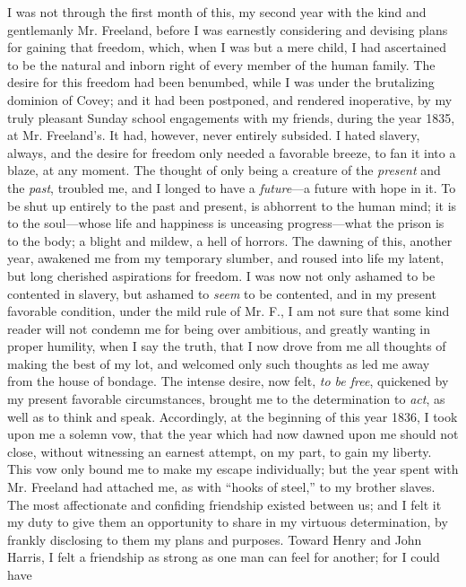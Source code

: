 I was not through the first month of this, my second year with the kind
and gentlemanly Mr. Freeland, before I was earnestly considering and
devising plans for gaining that freedom, which, when I was but a mere
child, I had ascertained to be the natural and inborn right of every
member of the human family. The desire for this freedom had been
benumbed, while I was under the brutalizing dominion of Covey; and it
had been postponed, and rendered inoperative, by my truly pleasant
Sunday school engagements with my friends, during the year 1835, at Mr.
Freeland's. It had, however, never entirely subsided. I hated slavery,
always, and the desire for freedom only needed a favorable breeze, to
fan it into a blaze, at any moment. The thought of only being a creature
of the \emph{present} and the \emph{past}, troubled me, and I longed to
have a \emph{future}---a future with hope in it. To be shut up entirely
to the past and present, is abhorrent to the human mind; it is to the
soul---whose life and happiness is unceasing progress---what the prison
is to the body; a blight and mildew, a hell of horrors. The dawning of
this, another year, awakened me from my temporary slumber, and roused
into life my latent, but long cherished aspirations for freedom. I was
now not only ashamed to be contented in slavery, but ashamed to
\emph{seem} to be contented, and in my present favorable condition,
under the mild rule of {\protect\hypertarget{274}{}{}}Mr. F., I am not
sure that some kind reader will not condemn me for being over ambitious,
and greatly wanting in proper humility, when I say the truth, that I now
drove from me all thoughts of making the best of my lot, and welcomed
only such thoughts as led me away from the house of bondage. The intense
desire, now felt, \emph{to be free}, quickened by my present favorable
circumstances, brought me to the determination to \emph{act}, as well as
to think and speak. Accordingly, at the beginning of this year 1836, I
took upon me a solemn vow, that the year which had now dawned upon me
should not close, without witnessing an earnest attempt, on my part, to
gain my liberty. This vow only bound me to make my escape individually;
but the year spent with Mr. Freeland had attached me, as with ``hooks of
steel,'' to my brother slaves. The most affectionate and confiding
friendship existed between us; and I felt it my duty to give them an
opportunity to share in my virtuous determination, by frankly disclosing
to them my plans and purposes. Toward Henry and John Harris, I felt a
friendship as strong as one man can feel for another; for I could have
